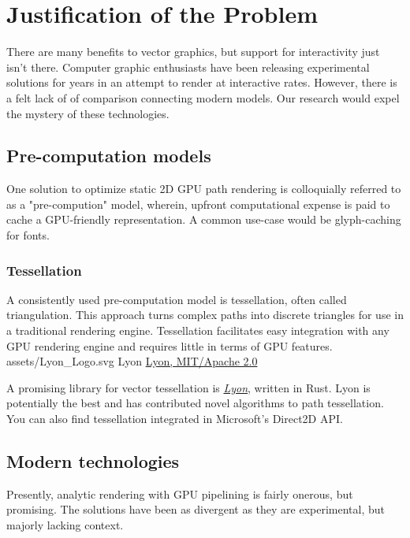\section{Justification of the Problem}

There are many benefits to vector graphics, but support for interactivity just isn't there. Computer graphic enthusiasts have been releasing experimental solutions for years in an attempt to render at interactive rates. However, there is a felt lack of of comparison connecting modern models. Our research would expel the mystery of these technologies.\\

\subsection{Pre-computation models}

One solution to optimize static 2D GPU path rendering is colloquially referred to as a "pre-compution" model, wherein, upfront computational expense is paid to cache a GPU-friendly representation. A common use-case would be glyph-caching for fonts.

\subsubsection{Tessellation}

A consistently used pre-computation model is tessellation, often called triangulation. This approach turns complex paths into discrete triangles for use in a traditional rendering engine. Tessellation facilitates easy integration with any GPU rendering engine and requires little in terms of GPU features.\\

\smallsvg
{assets/Lyon_Logo.svg}
{Lyon}
{\href{https://github.com/nical/lyon}{Lyon, MIT/Apache 2.0}}

A promising library for vector tessellation is \href{https://github.com/nical/lyon}{\textit{Lyon}}, written in Rust. Lyon is potentially the best and has contributed novel algorithms to path tessellation\cite{Lyon}. You can also find tessellation integrated in Microsoft's Direct2D API\cite{D2D_Tess}.

\subsection{Modern technologies}

Presently, analytic rendering with GPU pipelining is fairly onerous, but promising. The solutions have been as divergent as they are experimental, but majorly lacking context.\\

